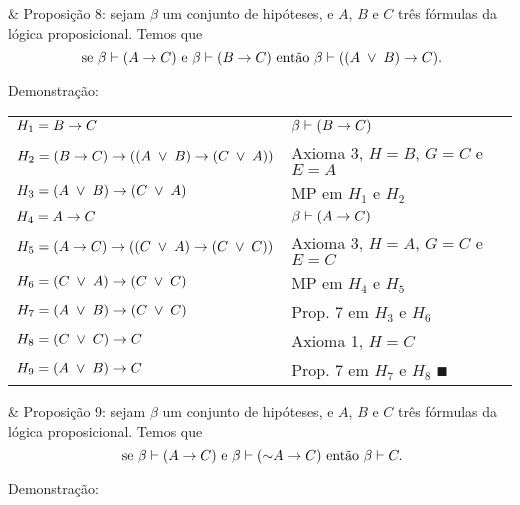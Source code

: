 \SKIP

\begin{easylist}

  & Proposição 8: sejam $\beta$ um conjunto de hipóteses, e $A$, $B$ e $C$ três fórmulas da lógica proposicional. Temos que \[ \mbox{ se } \beta \vdash (A \rightarrow C) \mbox{ e } \beta \vdash (B \rightarrow C) \mbox{ então } \beta \vdash ( (A \;\lor\; B) \rightarrow C). \]

\end{easylist}

Demonstração:

\begin{tabular}{p{}p{}}
  \hline
    $H_1 = B \rightarrow C$                                           & $ \beta \vdash (B \rightarrow C)$ \\
    $H_2 = (B \rightarrow C) \rightarrow ( (A \;\lor\; B) \rightarrow (C \;\lor\; A) )$       & Axioma 3, $H = B$, $G = C$ e $E = A$ \\
    $H_3 = (A \;\lor\; B) \rightarrow (C \;\lor\; A)$                           & MP em $H_1$ e $H_2$ \\
    $H_4 = A \rightarrow C$                                           & $ \beta \vdash (A \rightarrow C)$ \\
    $H_5 = (A \rightarrow C) \rightarrow ( (C \;\lor\; A) \rightarrow (C \;\lor\; C) )$       & Axioma 3, $H = A$, $G = C$ e $E = C$ \\
    $H_6 = (C \;\lor\; A) \rightarrow (C \;\lor\; C)$                           & MP em $H_4$ e $H_5$ \\
    $H_7 = (A \;\lor\; B) \rightarrow (C \;\lor\; C)$                           & Prop. 7 em $H_3$ e $H_6$ \\
    $H_8 = (C \;\lor\; C) \rightarrow C$                                   & Axioma 1, $H = C$ \\
    $H_9 = (A \;\lor\; B) \rightarrow C$                                   & Prop. 7 em $H_7$ e $H_8$ $\QED$ \\
  \hline
\end{tabular}

\SKIP

\begin{easylist}

  & Proposição 9: sejam $\beta$ um conjunto de hipóteses, e $A$, $B$ e $C$ três fórmulas da lógica proposicional. Temos que \[ \mbox{ se } \beta \vdash (A \rightarrow C) \mbox{ e } \beta \vdash (\mathord{\sim} A \rightarrow C) \mbox{ então } \beta \vdash  C. \]

\end{easylist}

Demonstração:


